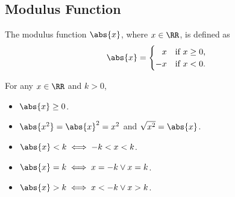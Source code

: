 \subsection{Modulus Function}

\begin{definition}
    The modulus function $\abs{x}$, where $x \in \RR$, is defined as \[\abs{x} = \begin{cases}
        \phantom{-}x & \text{if $x \geq 0$,}\\
        -x & \text{if $x < 0$.}
    \end{cases}\]
\end{definition}

\begin{fact}
    For any $x \in \RR$ and $k > 0$,
    \begin{itemize}
        \item $\abs{x} \geq 0$.
        \item $\abs{x^2} = \abs{x}^2 = x^2$ and $\sqrt{x^2} = \abs{x}$.
        \item $\abs{x} < k \iff -k < x < k$.
        \item $\abs{x} = k \iff x = -k \lor x = k$.
        \item $\abs{x} > k \iff x < -k \lor x > k$.
    \end{itemize}
\end{fact}